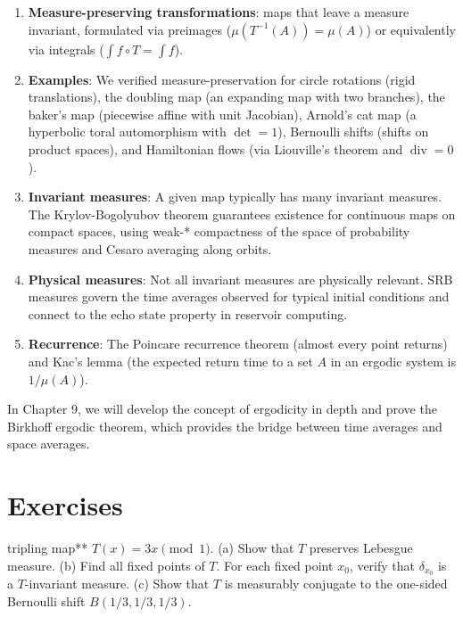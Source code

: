\begin{enumerate}[nosep]
  \item \textbf{Measure-preserving transformations}: maps that leave a measure invariant, formulated via preimages ($\mu(T^{-1}(A)) = \mu(A)$) or equivalently via integrals ($\int f \circ T = \int f$).

  \item \textbf{Examples}: We verified measure-preservation for circle rotations (rigid translations), the doubling map (an expanding map with two branches), the baker's map (piecewise affine with unit Jacobian), Arnold's cat map (a hyperbolic toral automorphism with $\det = 1$), Bernoulli shifts (shifts on product spaces), and Hamiltonian flows (via Liouville's theorem and $\operatorname{div} = 0$).

  \item \textbf{Invariant measures}: A given map typically has many invariant measures. The Krylov-Bogolyubov theorem guarantees existence for continuous maps on compact spaces, using weak-* compactness of the space of probability measures and Cesaro averaging along orbits.

  \item \textbf{Physical measures}: Not all invariant measures are physically relevant. SRB measures govern the time averages observed for typical initial conditions and connect to the echo state property in reservoir computing.

  \item \textbf{Recurrence}: The Poincare recurrence theorem (almost every point returns) and Kac's lemma (the expected return time to a set $A$ in an ergodic system is $1/\mu(A)$).
\end{enumerate}

In Chapter 9, we will develop the concept of ergodicity in depth and prove the Birkhoff ergodic theorem, which provides the bridge between time averages and space averages.


\bigskip


\section*{Exercises}

\begin{exercise}
tripling map** $T(x) = 3x \pmod{1}$.
(a) Show that $T$ preserves Lebesgue measure.
(b) Find all fixed points of $T$. For each fixed point $x_0$, verify that $\delta_{x_0}$ is a $T$-invariant measure.
(c) Show that $T$ is measurably conjugate to the one-sided Bernoulli shift $B(1/3, 1/3, 1/3)$.
\end{exercise}


